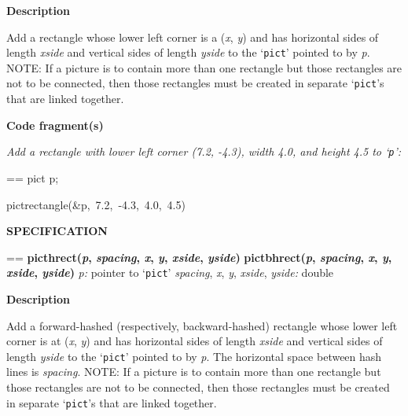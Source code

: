 \documentclass{book}
\makeatletter
\newcommand\Texinfocommandstyletextvar[1]{{\normalfont{}\textsl{#1}}}%
\newenvironment{Texinfopreformatted}{%
  \par\GNUTobeylines\obeyspaces\frenchspacing\parskip=\z@\parindent=\z@}{}
{\catcode`\^^M=13 \gdef\GNUTobeylines{\catcode`\^^M=13 \def^^M{\null\par}}}
\newenvironment{Texinfoindented}{\begin{list}{}{}\item\relax}{\end{list}}
\renewcommand{\_}{\Texinfounderscore\discretionary{}{}{}}
\makeatother
\begin{document}
\noindent{}\textbf{Description}

Add a rectangle whose lower left corner is a (\Texinfocommandstyletextvar{x}, \Texinfocommandstyletextvar{y})
and has horizontal sides of length
\Texinfocommandstyletextvar{xside} and vertical sides of length \Texinfocommandstyletextvar{yside}
to the `\texttt{pict}' pointed to by \Texinfocommandstyletextvar{p}.
NOTE: If a picture is to contain more than one rectangle but those
rectangles are not to be connected, then those rectangles must
be created in separate `\texttt{pict}'s that are linked together.

\noindent{}\textbf{Code fragment(s)}

\emph{Add a rectangle with lower left corner (7.2, -4.3),
width 4.0, and height 4.5 to `\texttt{p}':}
\begin{Texinfoindented}
\begin{Texinfopreformatted}%
\ttfamily pict p;

pict\_rectangle(\&p,\ 7.2,\ -4.3,\ 4.0,\ 4.5)
\end{Texinfopreformatted}
\end{Texinfoindented}

\noindent{}\textbf{SPECIFICATION}
\begin{Texinfoindented}
\begin{Texinfopreformatted}%
\textbf{pict\_hrect(\Texinfocommandstyletextvar{p}, \Texinfocommandstyletextvar{spacing}, \Texinfocommandstyletextvar{x}, \Texinfocommandstyletextvar{y}, \Texinfocommandstyletextvar{xside}, \Texinfocommandstyletextvar{yside})}
\textbf{pict\_bhrect(\Texinfocommandstyletextvar{p}, \Texinfocommandstyletextvar{spacing}, \Texinfocommandstyletextvar{x}, \Texinfocommandstyletextvar{y}, \Texinfocommandstyletextvar{xside}, \Texinfocommandstyletextvar{yside})}
\Texinfocommandstyletextvar{p:} pointer to `\texttt{pict}'
\Texinfocommandstyletextvar{spacing}, \Texinfocommandstyletextvar{x}, \Texinfocommandstyletextvar{y}, \Texinfocommandstyletextvar{xside}, \Texinfocommandstyletextvar{yside:} double
\end{Texinfopreformatted}
\end{Texinfoindented}
%
%

\noindent{}\textbf{Description}

Add a forward-hashed (respectively, backward-hashed) rectangle whose lower left corner is at
(\Texinfocommandstyletextvar{x}, \Texinfocommandstyletextvar{y}) and has horizontal sides of length
\Texinfocommandstyletextvar{xside} and vertical sides of length \Texinfocommandstyletextvar{yside}
to the `\texttt{pict}' pointed to by \Texinfocommandstyletextvar{p}.
The horizontal space between hash lines is \Texinfocommandstyletextvar{spacing}.
NOTE: If a picture is to contain more than one rectangle but those
rectangles are not to be connected, then those rectangles must
be created in separate `\texttt{pict}'s that are linked together.
\end{document}
